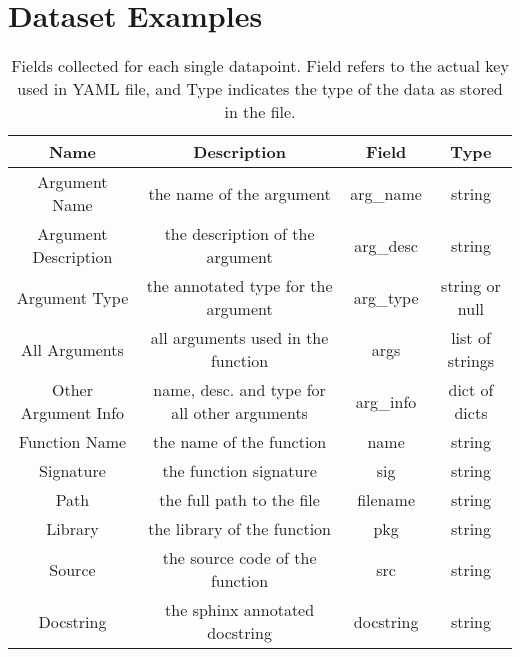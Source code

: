 
\chapter{Dataset Examples}
\label{example_datapoint}

\begin{table}[h!]
    \begin{center}
    \begin{tabular}{| c | c | c | c |}
        \hline
        Name &  Description     &    Field    & Type  \\
        \hline
        Argument Name & the name of the argument  & arg\_name & string \\
        Argument Description & the description of the argument & arg\_desc & string \\
        Argument Type & the annotated type for the argument & arg\_type & string or null \\
        All Arguments & all arguments used in the function & args & list of strings \\
        Other Argument Info & name, desc. and type for all other arguments & arg\_info & dict of dicts\\
        Function Name & the name of the function & name & string\\
        Signature & the function signature & sig & string\\
        Path & the full path to the file & filename & string \\
        Library & the library of the function & pkg & string\\
        Source & the source code of the function & src & string\\
        Docstring & the sphinx annotated docstring & docstring & string\\

        \hline


    \end{tabular}
    \caption {Fields collected for each single datapoint. Field refers to the actual key used in YAML file, and Type indicates the type of the data as stored in the file.}
    \label{table:metadata}
    \end{center}
\end{table}




